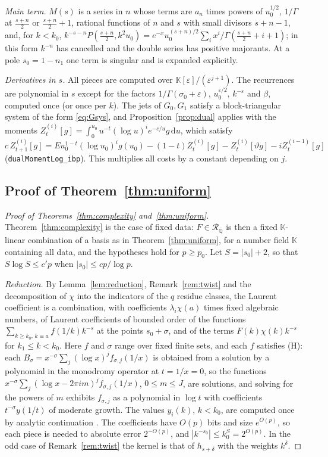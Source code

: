 \documentclass[11pt,reqno]{amsart}
\theoremstyle{definition}
\theoremstyle{remark}
\newcommand{\dd}{\,\mathrm{d}}
\newcommand{\Qbar}{\overline{\mathbb{Q}}}
\newcommand{\RegQ}{\mathcal{R}_{\Qbar}}
\begin{document}
\begin{small}
\emph{Main term.} $M(s)$ is a series in $n$ whose terms are $a_n$ times powers of $u_0^{1/2}$, $1/\Gamma$ at
$\frac{s+n}2$ or $\frac{s+n}2 + 1$, rational functions of $n$ and $s$ with small divisors $s + n - 1$, and, for $k < k_0$,
$k^{-s-n}P(\frac{s+n}2, k^2u_0) = e^{-x}u_0^{(s+n)/2}\sum_ix^i/\Gamma(\frac{s+n}2+i+1)$; in this form $k^{-n}$ has
cancelled and the double series has positive majorants. At a pole $s_0 = 1 - n_1$ one term is singular and is
expanded explicitly.

\emph{Derivatives in $s$.} All pieces are computed over $\mathbb K[\varepsilon]/(\varepsilon^{j+1})$. The recurrences
are polynomial in $s$ except for the factors $1/\Gamma(\sigma_0 + \varepsilon)$, $u_0^{\varepsilon/2}$, $k^{-\varepsilon}$
and $\beta$, computed once (or once per $k$). The jets of $G_0, G_1$ satisfy a block-triangular system of the form
\eqref{eq:Gsys}, and Proposition~\ref{prop:dual} applies with the moments
$Z^{(i)}_t[g] = \int_0^{u_0}u^{-t}(\log u)^ie^{-c/u}g\dd u$, which satisfy
$c\,Z^{(i)}_{t+1}[g] = Eu_0^{1-t}(\log u_0)^ig(u_0) - (1-t)Z^{(i)}_t[g] - Z^{(i)}_t[\vartheta g] - iZ^{(i-1)}_t[g]$
(\nolinkurl{dualMomentLog_ibp}).
This multiplies all costs by a constant depending on $j$.

\subsection{Proof of Theorem~\ref{thm:uniform}}\label{app:uniform}
\begin{proof}[Proof of Theorems~\ref{thm:complexity} and~\ref{thm:uniform}]
Theorem~\ref{thm:complexity} is the case of fixed data: $F \in \RegQ$ is then a fixed $\mathbb K$-linear combination of
a basis as in Theorem~\ref{thm:uniform}, for a number field $\mathbb K$ containing all data, and the hypotheses hold
for $p \ge p_0$. Let $S = |s_0| + 2$, so that $S\log S \le c'p$ when $|s_0| \le cp/\log p$.

\emph{Reduction.} By Lemma~\ref{lem:reduction}, Remark~\ref{rem:twist} and the decomposition of $\chi$ into the
indicators of the $q$ residue classes, the Laurent coefficient is a combination, with coefficients $\lambda_i\chi(a)$
times fixed algebraic numbers, of Laurent coefficients of bounded order of the functions
$\sum_{k\ge k_0,\,k\equiv a}f(1/k)k^{-s}$ at the points $s_0 + \sigma$, and of the terms $F(k)\chi(k)k^{-s}$ for
$k_1 \le k < k_0$. Here $f$ and $\sigma$ range over fixed finite sets, and each $f$ satisfies (H): each
$B_\sigma = x^{-\sigma}\sum_j(\log x)^jf_{\sigma,j}(1/x)$ is obtained from a solution by a polynomial in the
monodromy operator at $t = 1/x = 0$, so the functions $x^{-\sigma}\sum_j(\log x - 2\pi im)^jf_{\sigma,j}(1/x)$,
$0 \le m \le J$, are solutions, and solving for the powers of $m$ exhibits $f_{\sigma,j}$ as a polynomial in
$\log t$ with coefficients $t^{-\sigma}y(1/t)$ of moderate growth. The values $y_i(k)$, $k < k_0$, are computed once
by analytic continuation \cite{CC90,vdH99}. The coefficients have $O(p)$ bits and size $e^{O(p)}$, so each piece is
needed to absolute error $2^{-O(p)}$, and $|k^{-s_0}| \le k_0^S = 2^{O(p)}$. In the odd case of Remark~\ref{rem:twist}
the kernel is that of $h_{s+\delta}$ with the weights $k^\delta$.


\end{proof}
\end{small}
\end{document}
